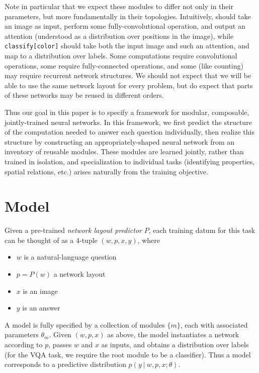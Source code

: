 \documentclass[10pt,twocolumn,letterpaper]{article}
\begin{document}
Note in particular that we expect these modules to differ not only in their
parameters, but more fundamentally in their topologies. Intuitively,
 should take an image as input, perform some
fully-convolutional operation, and output an attention (understood as a
distribution over positions in the image), while {\small\tt classify[color]}
should take both the input image and such an attention, and map to a
distribution over labels. Some computations require convolutional operations,
some require fully-connected operations, and some (like counting) may require
recurrent network structures. We should not expect that we will be able to use
the same network layout for every problem, but do expect that parts of these
networks may be reused in different orders.

Thus our goal in this paper is to specify a framework for modular, composable,
jointly-trained neural networks. In this framework, we first predict the
structure of the computation needed to answer each question individually, then
realize this structure by constructing an appropriately-shaped neural network
from an inventory of reusable modules. These modules are learned jointly, rather
than trained in isolation, and specialization to individual tasks (identifying
properties, spatial relations, etc.) arises naturally from the training
objective.



\section{Model}

Given a pre-trained \emph{network layout predictor} $P$, each training datum for
this task can be thought of as a 4-tuple $(w, p, x, y)$, where
\begin{itemize}
  \setlength\itemsep{0em}
  \item $w$ is a natural-language question
  \item $p = P(w)$ a network layout
  \item $x$ is an image
  \item $y$ is an answer
\end{itemize}
A model is fully specified by a collection of modules $\{ m \}$, each with
associated parameters $\theta_m$. Given $(w, p, x)$ as above, the model
instantiates a network according to $p$, passes $w$ and $x$ as inputs, and
obtains a distribution over labels (for the VQA task, we require the root module
to be a classifier). Thus a model corresponds to a predictive distribution $p(y\
|\ w, p, x; \theta)$.
\end{document}

